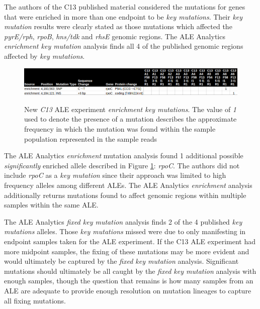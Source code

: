 \documentclass[12pt,final,masters,chapterheads]{ucsd}  %
\newcommand\todo[1]{\textcolor{red}{#1}}
\begin{document}
The authors of the C13 published material considered the mutations for genes that were enriched in more than one endpoint to be \textit{key mutations}. Their \textit{key mutation} results were clearly stated as those mutations which affected the \textit{pyrE/rph}, \textit{rpoB}, \textit{hns/tdk} and \textit{rhsE} genomic regions. The ALE Analytics \textit{enrichment key mutation} analysis finds all 4 of the published genomic regions affected by \textit{key mutations}.
\begin{figure}[H]
  \caption{New \textit{C13} ALE experiment \textit{enrichment key mutations}. The value of \textit{1} used to denote the presence of a mutation describes the approximate frequency in which the mutation was found within the sample population represented in the sample reads \cite{breseq_paper}}
  \centering
  \includegraphics[width=\textwidth]{c13_new_enrich_muts.png}
  \label{fig:c13_new_enrich_muts}
\end{figure}
The ALE Analytics \textit{enrichment} mutation analysis found 1 additional possible \textit{significantly} enriched allele described in Figure \ref{fig:c13_new_enrich_muts}: \textit{rpoC}. The authors did not include \textit{rpoC} as a \textit{key mutation} since their approach was limited to high frequency alleles among different ALEs. The ALE Analytics \textit{enrichment} analysis additionally returns mutations found to affect genomic regions within multiple samples within the same ALE.

The ALE Analytics \textit{fixed key mutation} analysis finds 2 of the 4 published \textit{key mutations} alleles. Those \textit{key mutations} missed were due to only manifesting in endpoint samples taken for the ALE experiment. If the C13 ALE experiment had more midpoint samples, the fixing of these mutations may be more evident and would ultimately be captured by the \textit{fixed key mutation} analysis. Significant mutations should ultimately be all caught by the \textit{fixed key mutation} analysis with enough samples, though the question that remains is how many samples from an ALE are adequate to provide enough resolution on mutation lineages to capture all fixing mutations.
\end{document}
